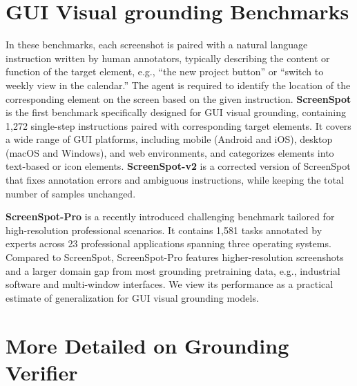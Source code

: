 \documentclass{article}
\begin{document}
\section{GUI Visual grounding Benchmarks}
\label{sec:grounding_benchmark}
In these benchmarks, each screenshot is paired with a natural language instruction written by human annotators, typically describing the content or function of the target element, e.g., “the new project button” or “switch to weekly view in the calendar.”
The agent is required to identify the location of the corresponding element on the screen based on the given instruction.
\textbf{ScreenSpot} is the first benchmark specifically designed for GUI visual grounding, containing 1,272 single-step instructions paired with corresponding target elements.
It covers a wide range of GUI platforms, including mobile (Android and iOS), desktop (macOS and Windows), and web environments, and categorizes elements into text-based or icon elements.
\textbf{ScreenSpot-v2} is a corrected version of ScreenSpot that fixes annotation errors and ambiguous instructions, while keeping the total number of samples unchanged.

\textbf{ScreenSpot-Pro} is a recently introduced challenging benchmark tailored for high-resolution professional scenarios.
It contains 1,581 tasks annotated by experts across 23 professional applications spanning three operating systems.
Compared to ScreenSpot, ScreenSpot-Pro features higher-resolution screenshots and a larger domain gap from most grounding pretraining data, e.g., industrial software and multi-window interfaces.
We view its performance as a practical estimate of generalization for GUI visual grounding models.



\section{More Detailed on Grounding Verifier}
\end{document}
